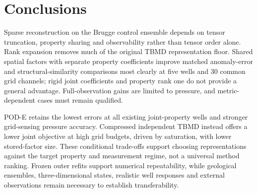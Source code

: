 \section{Conclusions}
\label{sec:conclusions}
Sparse reconstruction on the Brugge control ensemble depends on tensor truncation, property sharing and observability rather than tensor order alone. Rank expansion removes much of the original TBMD representation floor. Shared spatial factors with separate property coefficients improve matched anomaly-error and structural-similarity comparisons most clearly at five wells and 30 common grid channels; rigid joint coefficients and property rank one do not provide a general advantage. Full-observation gains are limited to pressure, and metric-dependent cases must remain qualified.

POD-E retains the lowest errors at all existing joint-property wells and stronger grid-sensing pressure accuracy. Compressed independent TBMD instead offers a lower joint objective at high grid budgets, driven by saturation, with lower stored-factor size. These conditional trade-offs support choosing representations against the target property and measurement regime, not a universal method ranking. Frozen outer refits support numerical repeatability, while geological ensembles, three-dimensional states, realistic well responses and external observations remain necessary to establish transferability.
